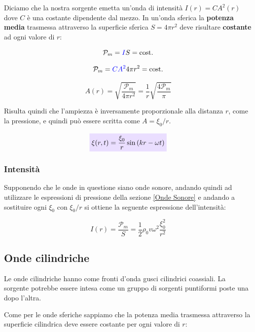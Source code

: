 \documentclass[x11names]{report}
\newcommand{\viola}[1]{\colorbox{yred}{$\displaystyle #1$}}
\begin{document}
	\noindent
	Diciamo che la nostra sorgente emetta un'onda di intensità \(I(r) = CA^2(r)\) dove \(C\) è una costante dipendente dal mezzo. In un'onda sferica la \textbf{potenza media} trasmessa attraverso la superficie sferica \(S = 4\pi r^2\) deve risultare \textbf{costante} ad ogni valore di \(r\):
	
	\[ 
	\mathcal{P}_m = \textcolor{blue}{I}S = \text{cost.}
	\] 
	
	\[ 
	\mathcal{P}_m = \textcolor{blue}{CA^2}4\pi r^2 = \text{cost.}
	\]
	
	\[ 
	A(r) = \sqrt{\frac{\mathcal{P}_m}{4\pi r^2}} = \frac{1}{r}\sqrt{\frac{4\mathcal{P}_m}{\pi}}
	\]
	
	\noindent
	Risulta quindi che l'ampiezza è inversamente proporzionale alla distanza \(r\), come la pressione, e quindi può essere scritta come \(A = \xi_0 /r\).
	
	\begin{equation}
		\viola{\xi(r,t) = \frac{\xi_0}{r}\sin\left(kr -\omega t\right)}
	\end{equation}
	
	\subsubsection{Intensità}
	Supponendo che le onde in questione siano onde sonore, andando quindi ad utilizzare le espressioni di pressione della sezione \ref{Onde Sonore} e andando a sostituire ogni \(\xi_0\) con \(\xi_0/r\) si ottiene la seguente espressione dell'intensità:
	
	\[ 
	I(r) = \frac{\mathcal{P}_m}{S} = \frac{1}{2} \rho_0 v \omega ^2 \frac{\xi_0^2}{r^2}
	\]
	
	\subsection{Onde cilindriche}
	Le onde cilindriche hanno come fronti d'onda gusci cilindrici coassiali. La sorgente potrebbe essere intesa come un gruppo di sorgenti puntiformi poste una dopo l'altra.
	
	Come per le onde sferiche sappiamo che la potenza media trasmessa attraverso la superficie cilindrica deve essere costante per ogni valore di \(r\):
\end{document}
